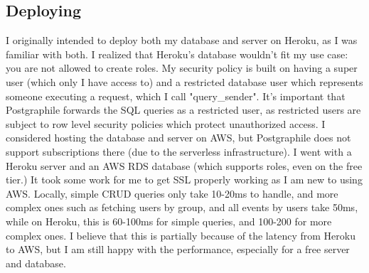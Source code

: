 \documentclass{l4proj}
\begin{document}
\subsection{Deploying}
I originally intended to deploy both my database and server on Heroku, as I was familiar with both. I realized that Heroku's database wouldn't fit my use case: you are not allowed to create roles. My security policy is built on having a super user (which only I have access to) and a restricted database user which represents someone executing a request, which I call "query\_sender". It's important that Postgraphile forwards the SQL queries as a restricted user, as restricted users are subject to row level security policies which protect unauthorized access. I considered hosting the database and server on AWS, but Postgraphile does not support subscriptions there (due to the serverless infrastructure). I went with a Heroku server and an AWS RDS database (which supports roles, even on the free tier.) It took some work for me to get SSL properly working as I am new to using AWS. Locally, simple CRUD queries only take 10-20ms to handle, and more complex ones such as fetching users by group, and all events by users take 50ms, while on Heroku, this is 60-100ms for simple queries, and 100-200 for more complex ones. I believe that this is partially because of the latency from Heroku to AWS, but I am still happy with the performance, especially for a free server and database.
\end{document}
